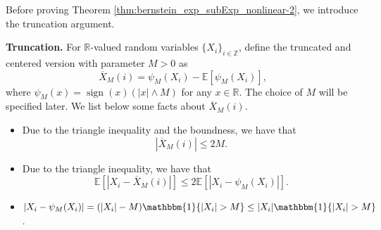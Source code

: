 \documentclass[11pt]{article}
\DeclareMathOperator*{\sign}{sign}
\theoremstyle{plain}
\theoremstyle{definition}
\begin{document}
Before proving Theorem \ref{thm:bernstein_exp_subExp_nonlinear-2}, we introduce the truncation argument.

\textbf{Truncation.} For $\mathbb{R}$-valued random variables $\{X_i\}_{i \in \mathbb{Z}}$, define the truncated and centered version with parameter $M > 0$ as
\begin{equation*}
    \overline{X}_M(i) = \psi_M(X_i) - \mathbb{E}[\psi_M(X_i)],
\end{equation*}
where $\psi_M(x) = \sign(x)(|x| \wedge M)$ for any $x \in \mathbb{R}$. The choice of $M$ will be specified later. We list below some facts about $\overline{X}_M(i)$.
\begin{itemize}
    \item Due to the triangle inequality and the boundness, we have that 
    \begin{equation*}
        |\overline{X}_M(i)| \leq 2M.
    \end{equation*}
    \item Due to the triangle inequality, we have that 
    \begin{equation*}
        \mathbb{E}[|X_i - \overline{X}_M(i)|] \leq 2\mathbb{E}[|X_i - \psi_M(X_i)|].
    \end{equation*}
    \item $|X_i - \psi_M(X_i)| = (|X_i|-M)\mathbbm{1}\{|X_i| > M\} \leq |X_i|\mathbbm{1}\{|X_i| > M\}$.
\end{itemize}
\end{document}
